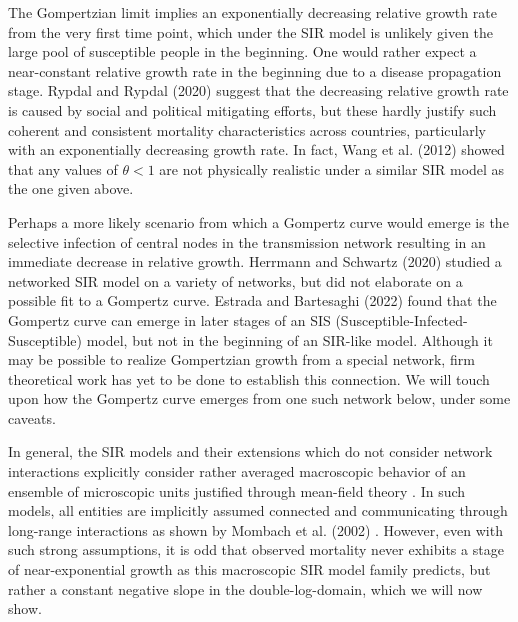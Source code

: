 \documentclass{article}
\begin{document}
 The Gompertzian limit implies an exponentially decreasing relative growth rate from the very first time point, which under the SIR model is unlikely given the large pool of susceptible people in the beginning. 
 One would rather expect a near-constant relative growth rate in the beginning due to a disease propagation stage. 
 Rypdal and Rypdal (2020) \cite{Rypdal2020} suggest that the decreasing relative growth rate is caused by social and political mitigating efforts, but these hardly justify such coherent and consistent mortality characteristics across countries, particularly with an exponentially decreasing growth rate. In fact, Wang et al. (2012) \cite{wang2012richards} showed that any values of $\theta<1$ are not physically realistic under a similar SIR model as the one given above. 
 
 Perhaps a more likely scenario from which a Gompertz curve would emerge is the selective infection of central nodes in the transmission network resulting in an immediate decrease in relative growth. 
 Herrmann and Schwartz (2020) \cite{herrmann2020covid} studied a networked SIR model on a variety of networks, but did not elaborate on a possible fit to a Gompertz curve. Estrada and Bartesaghi (2022) \cite{estrada2022networked} found that the Gompertz curve can emerge in later stages of an SIS (Susceptible-Infected-Susceptible) model, but not in the beginning of an SIR-like model.
 Although it may be possible to realize Gompertzian growth from a special network, firm theoretical work has yet to be done to establish this connection. 
 We will touch upon how the Gompertz curve emerges from one such network below, under some caveats.

 In general, the SIR models and their extensions which do not consider network interactions explicitly consider rather averaged macroscopic behavior of an ensemble of microscopic units justified through mean-field theory \cite{smilkov2014beyond}. In such models, all entities are implicitly assumed connected and communicating through long-range interactions as shown by Mombach et al. (2002) \cite{mombach2002mean}.
However, even with such strong assumptions, it is odd that observed mortality never exhibits a stage of near-exponential growth as this macroscopic SIR model family predicts, but rather a constant negative slope in the double-log-domain, which we will now show. 
\end{document}
